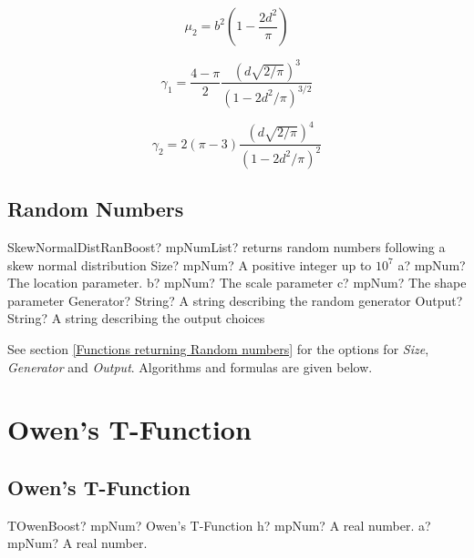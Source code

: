 \begin{equation} 
	\mu_2 = b^2 \left(1-\frac{2d^2}{\pi} \right)
\end{equation}

\begin{equation} 
	\gamma_1 = \frac{4-\pi}{2} \frac{\left(d\sqrt{2/\pi}\right)^3}{(1-2d^2/\pi)^{3/2}}
\end{equation}

\begin{equation} 
	\gamma_2 = 2(\pi-3) \frac{\left(d\sqrt{2/\pi}\right)^4}{(1-2d^2/\pi)^{2}}
\end{equation}


\subsection{Random Numbers}
\label{SkewNormalDistributionRandom}

\begin{mpFunctionsExtract}
	\mpFunctionSix
	{SkewNormalDistRanBoost? mpNumList? returns random numbers following a skew normal distribution}
	{Size? mpNum? A positive integer up to $10^7$}
	{a? mpNum? The location parameter.}
	{b? mpNum? The scale parameter}
	{c? mpNum? The shape parameter}
	{Generator? String? A string describing the random generator}
	{Output? String? A string describing the output choices}
\end{mpFunctionsExtract}

\vspace{0.3cm}

See section \ref{Functions returning Random numbers} for the options for  {\itshape\sffamily Size},  {\itshape\sffamily Generator} and {\itshape\sffamily Output}. Algorithms and formulas are given below.






\section{Owen's T-Function}
\subsection{Owen's T-Function}
\label{sec:OwenTFunction}


\begin{mpFunctionsExtract}
	\mpFunctionTwo
	{TOwenBoost? mpNum? Owen's T-Function}
	{h? mpNum? A real number.}
	{a? mpNum? A real number.}
\end{mpFunctionsExtract}


